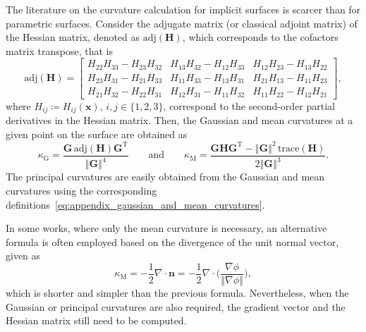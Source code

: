The literature on the curvature calculation for implicit surfaces is scarcer than for parametric surfaces.
Consider the adjugate matrix (or classical adjoint matrix) of the Hessian matrix, denoted as $\textrm{adj}\left(\bm{H}\right)$, which corresponds to the cofactors matrix transpose, that is
\begin{equation}
\textrm{adj}\left(\bm{H}\right)
=
\begin{bmatrix}
H_{22}H_{33}-H_{23}H_{32} & H_{13}H_{32}-H_{12}H_{33} & H_{12}H_{23}-H_{13}H_{22}\\
H_{23}H_{31}-H_{21}H_{33} & H_{11}H_{33}-H_{13}H_{31} & H_{21}H_{13}-H_{11}H_{23} \\
H_{21}H_{32}-H_{22}H_{31} & H_{12}H_{31}-H_{11}H_{32} & H_{11}H_{22}-H_{12}H_{21}
\end{bmatrix},
\end{equation}
where $H_{ij}\coloneqq H_{ij}\left(\bm{x}\right)$, $i,j\in\lbrace 1,2,3\rbrace$, correspond to the second-order partial derivatives in the Hessian matrix.
Then, the Gaussian and mean curvatures at a given point on the surface are obtained as
\begin{equation}
\kappa_{\textrm{G}}=\dfrac{\bm{G}\,\textrm{adj}\left(\bm{H}\right)\bm{G}^{\textrm{T}}}{\left\Vert\bm{G}\right\Vert^{4}}
\qquad
\textrm{and}
\qquad
\kappa_{\textrm{M}}=\dfrac{\bm{G}\bm{H}\bm{G}^{\textrm{T}}-\left\Vert\bm{G}\right\Vert^{2}\,\textrm{trace}\left(\bm{H}\right)}{2\left\Vert\bm{G}\right\Vert^{3}}.
\end{equation}
The principal curvatures are easily obtained from the Gaussian and mean curvatures using the corresponding definitions~\cref{eq:appendix_gaussian_and_mean_curvatures}.

In some works, where only the mean curvature is necessary, an alternative formula is often employed based on the divergence of the unit normal vector, given as
\begin{equation}
\kappa_{\textrm{M}}=-\frac{1}{2}\nabla\cdot\bm{n}=-\frac{1}{2}\nabla\cdot\Biggl(\dfrac{\nabla\phi}{\left\Vert\nabla\phi\right\Vert}\Biggr),
\end{equation}
which is shorter and simpler than the previous formula.
Nevertheless, when the Gaussian or principal curvatures are also required, the gradient vector and the Hessian matrix still need to be computed.


